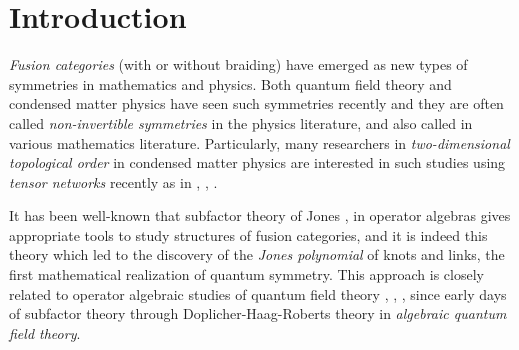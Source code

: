 \documentclass[12pt]{article}
\begin{document}
\begin{abstract}
Researchers in condensed matter physics recently 
study two-dimensional topological order in terms of
tensor networks involving certain $3$- and $4$-tensors.  
Their $3$-tensors satisfying the ``zipper condition'' 
play an important role there and such $3$-tensors can
be made into certain $2$-tensors by combining two wires
into one.  We
identify their $4$-tensors with bi-unitary connections in 
Jones' subfactor theory in operator algebras with precise
normalization constants.  
Then we prove that their $2$-tensors satisfying the zipper condition
are the same as flat fields of strings in subfactor
theory which correspond to elements in the higher relative
commutants of the subfactor arising from the bi-unitary
connection.  This is what we expect, since the zipper
condition is a kind of pentagon relations, but we
clarify what conditions are exactly needed for this ---
we do not need the flatness or the finite depth condition
for the bi-unitary connection.
We actually generalize their $4$-tensors so that the four
index sets of the $4$-tensors can be all different and
work on a ``half-version'' of the zipper condition.
\end{abstract}

\section{Introduction}

\textit{Fusion categories} \cite{EGNO}  (with or without braiding)
have emerged as new types of symmetries in mathematics
and physics.  Both quantum field theory and condensed
matter physics have seen such symmetries recently and
they are often called \textit{non-invertible
symmetries} in the physics literature, and also called
 in various mathematics literature.
Particularly, many researchers 
in \textit{two-dimensional topological order} in condensed
matter physics are interested in such studies 
using \textit{tensor networks} recently
as in \cite{BMWSHV}, \cite{MRGSCP}, \cite{RGMP}.

It has been well-known that subfactor theory of Jones
\cite{J1}, \cite{J2} in operator algebras gives appropriate
tools to study structures of fusion
categories, and it is indeed this theory which led to 
the discovery of the \textit{Jones polynomial} of knots
and links, the
first mathematical realization of quantum symmetry.
This approach is closely related to
operator algebraic studies of quantum field theory
\cite{L1}, \cite{L2}, \cite{EK2}, since early days
of subfactor theory through Doplicher-Haag-Roberts
theory in \textit{algebraic quantum field theory}.
\end{document}
